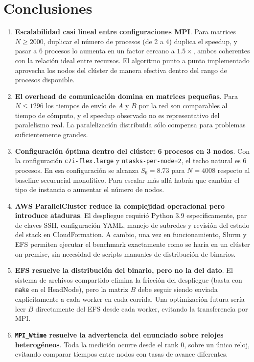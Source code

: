 \documentclass{article}
\begin{document}
\section{Conclusiones}

\begin{enumerate}
    \item \textbf{Escalabilidad casi lineal entre configuraciones MPI}. Para matrices $N \geq 2000$, duplicar el número de procesos (de 2 a 4) duplica el speedup, y pasar a 6 procesos lo aumenta en un factor cercano a $1.5\times$, ambos coherentes con la relación ideal entre recursos. El algoritmo punto a punto implementado aprovecha los nodos del clúster de manera efectiva dentro del rango de procesos disponible.

    \item \textbf{El overhead de comunicación domina en matrices pequeñas}. Para $N \leq 1296$ los tiempos de envío de $A$ y $B$ por la red son comparables al tiempo de cómputo, y el speedup observado no es representativo del paralelismo real. La paralelización distribuida sólo compensa para problemas suficientemente grandes.

    \item \textbf{Configuración óptima dentro del clúster: 6 procesos en 3 nodos}. Con la configuración \texttt{c7i-flex.large} y \texttt{ntasks-per-node=2}, el techo natural es 6 procesos. En esa configuración se alcanza $S_6 = 8.73$ para $N = 4008$ respecto al baseline secuencial monolítico. Para escalar más allá habría que cambiar el tipo de instancia o aumentar el número de nodos.

    \item \textbf{AWS ParallelCluster reduce la complejidad operacional pero introduce ataduras}. El despliegue requirió Python 3.9 específicamente, par de claves SSH, configuración YAML, manejo de subredes y revisión del estado del stack en CloudFormation. A cambio, una vez en funcionamiento, Slurm y EFS permiten ejecutar el benchmark exactamente como se haría en un clúster on-premise, sin necesidad de scripts manuales de distribución de binarios.

    \item \textbf{EFS resuelve la distribución del binario, pero no la del dato}. El sistema de archivos compartido elimina la fricción del despliegue (basta con \texttt{make} en el HeadNode), pero la matriz $B$ debe seguir siendo enviada explícitamente a cada worker en cada corrida. Una optimización futura sería leer $B$ directamente del EFS desde cada worker, evitando la transferencia por MPI.

    \item \textbf{\texttt{MPI\_Wtime} resuelve la advertencia del enunciado sobre relojes heterogéneos}. Toda la medición ocurre desde el rank 0, sobre un único reloj, evitando comparar tiempos entre nodos con tasas de avance diferentes.
\end{enumerate}
\end{document}
